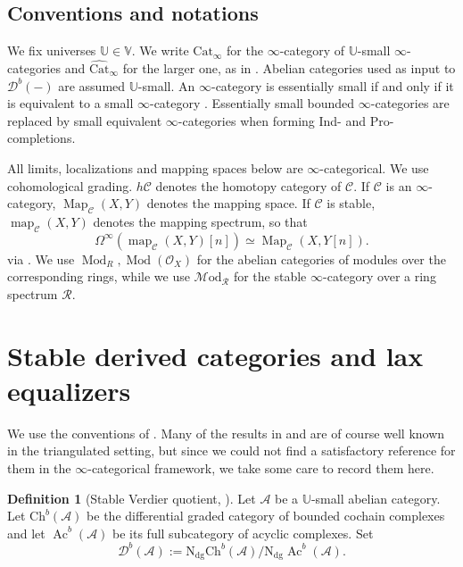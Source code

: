\documentclass[11pt]{amsart}
\newcommand{\cA}{\mathcal{A}}
\newcommand{\cO}{\mathcal{O}}
\newcommand{\cC}{\mathcal{C}}
\newcommand{\cR}{\mathcal{R}}
\newcommand{\Map}{\operatorname{Map}}
\newcommand{\map}{\operatorname{map}}
\newcommand{\Mod}{\operatorname{Mod}}
\newcommand{\cMod}{\mathcal{M}\mathrm{od}}
\newcommand{\Cat}{\mathrm{Cat}}
\newcommand{\Ch}{\mathrm{Ch}}
\newcommand{\Catbig}{\widehat{\mathrm{Cat}}}
\newcommand{\Ndg}{\mathrm N_{\mathrm{dg}}}
\newcommand{\Db}{\mathcal D^b}
\theoremstyle{plain}
\theoremstyle{definition}
\newtheorem{definition}[definition]{Definition}
\numberwithin{equation}{section}
\begin{document}
\subsection{Conventions and notations}\label{subsec:conventions}
We fix universes $\mathbb U\in\mathbb V$.
We write $\Cat_\infty$ for the $\infty$-category of $\mathbb U$-small $\infty$-categories and $\Catbig_\infty$ for the larger one, as in \cite[Definition 3.0.0.1; Remark 3.0.0.5]{HTT}.
Abelian categories used as input to $\Db(-)$ are assumed $\mathbb U$-small.
An $\infty$-category is essentially small if and only if it is equivalent to a small $\infty$-category \cite[Definition 5.4.1.3; Proposition 5.4.1.2(3)]{HTT}.
Essentially small bounded $\infty$-categories are replaced by small equivalent $\infty$-categories when forming Ind- and Pro-completions.

All limits, localizations and mapping spaces below are $\infty$-categorical.
We use cohomological grading.
$h\cC$ denotes the homotopy category of $\cC$.
If $\cC$ is an $\infty$-category, $\Map_{\cC}(X,Y)$ denotes the mapping space.
If $\cC$ is stable, $\map_{\cC}(X,Y)$ denotes the mapping spectrum, so that
\[
 \Omega^\infty(\map_{\cC}(X,Y)[n])\simeq\Map_{\cC}(X,Y[n]).
\]
\cite[Definition 2.15]{BGT} via \cite[Notation 1.4.2.20]{HA}.
We use $\Mod_R, \Mod(\cO_X)$ for the abelian categories of modules over the corresponding rings, while we use $\cMod_\cR$ for the stable $\infty$-category over a ring spectrum $\cR$.

\section{Stable derived categories and lax equalizers}\label{sec:foundations}
We use the conventions of .
Many of the results in  and  are of course well known in the triangulated setting, but since we could not find a satisfactory reference for them in the $\infty$-categorical framework, we take some care to record them here.

\begin{definition}[{Stable Verdier quotient, \cite[Definition 1.1, Definition 3.1(ii)]{Drew}}]\label{def:bounded}
Let $\cA$ be a $\mathbb U$-small abelian category.
Let $\Ch^b(\cA)$ be the differential graded category of bounded cochain complexes and let $\operatorname{Ac}^b(\cA)$ be its full subcategory of acyclic complexes.
Set
\[
 \Db(\cA):=\Ndg\Ch^b(\cA)\big/\Ndg\operatorname{Ac}^b(\cA).
\]
\end{definition}
\end{document}

